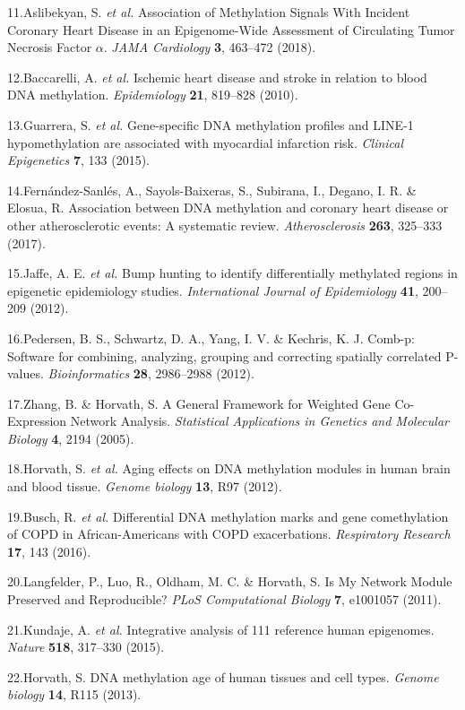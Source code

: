 \documentclass[]{article}
\theoremstyle{definition}
\theoremstyle{definition}
\theoremstyle{definition}
\theoremstyle{remark}
\begin{document}
11.Aslibekyan, S. \emph{et al.} Association of Methylation Signals With
Incident Coronary Heart Disease in an Epigenome-Wide Assessment of
Circulating Tumor Necrosis Factor \(\alpha\). \emph{JAMA Cardiology}
\textbf{3}, 463--472 (2018).

12.Baccarelli, A. \emph{et al.} Ischemic heart disease and stroke in
relation to blood DNA methylation. \emph{Epidemiology} \textbf{21},
819--828 (2010).

13.Guarrera, S. \emph{et al.} Gene-specific DNA methylation profiles and
LINE-1 hypomethylation are associated with myocardial infarction risk.
\emph{Clinical Epigenetics} \textbf{7}, 133 (2015).

14.Fern{á}ndez-Sanl{é}s, A., Sayols-Baixeras, S., Subirana, I., Degano,
I. R. \& Elosua, R. Association between DNA methylation and coronary
heart disease or other atherosclerotic events: A systematic review.
\emph{Atherosclerosis} \textbf{263}, 325--333 (2017).

15.Jaffe, A. E. \emph{et al.} Bump hunting to identify differentially
methylated regions in epigenetic epidemiology studies.
\emph{International Journal of Epidemiology} \textbf{41}, 200--209
(2012).

16.Pedersen, B. S., Schwartz, D. A., Yang, I. V. \& Kechris, K. J.
Comb-p: Software for combining, analyzing, grouping and correcting
spatially correlated P-values. \emph{Bioinformatics} \textbf{28},
2986--2988 (2012).

17.Zhang, B. \& Horvath, S. A General Framework for Weighted Gene
Co-Expression Network Analysis. \emph{Statistical Applications in
Genetics and Molecular Biology} \textbf{4}, 2194 (2005).

18.Horvath, S. \emph{et al.} Aging effects on DNA methylation modules in
human brain and blood tissue. \emph{Genome biology} \textbf{13}, R97
(2012).

19.Busch, R. \emph{et al.} Differential DNA methylation marks and gene
comethylation of COPD in African-Americans with COPD exacerbations.
\emph{Respiratory Research} \textbf{17}, 143 (2016).

20.Langfelder, P., Luo, R., Oldham, M. C. \& Horvath, S. Is My Network
Module Preserved and Reproducible? \emph{PLoS Computational Biology}
\textbf{7}, e1001057 (2011).

21.Kundaje, A. \emph{et al.} Integrative analysis of 111 reference human
epigenomes. \emph{Nature} \textbf{518}, 317--330 (2015).

22.Horvath, S. DNA methylation age of human tissues and cell types.
\emph{Genome biology} \textbf{14}, R115 (2013).
\end{document}

